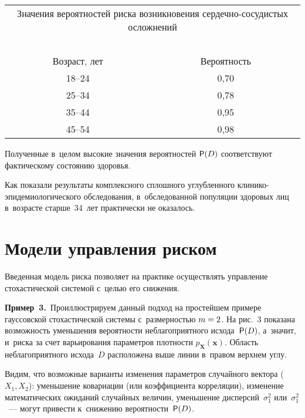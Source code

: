 \begin{multicols}{2}
{\small
  \begin{center}
  \begin{tabular}{|c|c|}
\multicolumn{2}{p{43mm}}{Значения вероятностей риска возникновения 
сер\-деч\-но-со\-су\-ди\-стых ослож\-не\-ний}\\[-6pt]
\multicolumn{2}{c}{\ }\\
\hline
Возраст, лет&Вероятность\\
\hline
18--24&0,70\\
25--34&0,78\\
35--44&0,95\\
45--54&0,98\\
\hline
\end{tabular}
\vspace*{2pt}
\end{center}
}

\columnbreak
  
  
  \noindent
   Полученные в~целом высокие значения 
вероятностей ${\sf P}(D)$ соответствуют фактическому со\-сто\-янию
   здоровья. 
   
   Как 
показали результаты комплексного сплош\-но\-го углуб\-лен\-но\-го  
кли\-ни\-ко-эпи\-де\-мио\-ло\-ги\-че\-ско\-го обследования, в~обследованной 
популяции здоровых лиц в~воз\-рас\-те старше~34~лет практически не оказалось.

 
\section{Модели управления риском}

  Введенная модель риска позволяет на практике осуществлять управ\-ле\-ние 
сто\-ха\-сти\-че\-ской сис\-те\-мой с~целью его снижения.
  
  \bigskip
  
  \noindent
  \textbf{Пример~3.}\ Проиллюстрируем данный подход на прос\-тей\-шем 
примере гауссовской стохастической сис\-те\-мы с~раз\-мер\-ностью $m\hm=2$. На 
рис.~3 показана воз\-мож\-ность уменьшения ве\-ро\-ят\-ности неблагоприятного 
исхода~${\sf P}(D)$, а~значит, и~рис\-ка за счет варьирования па\-ра\-мет\-ров плот\-ности 
$p_{\mathbf{X}}(\mathbf{x})$. Об\-ласть неблагоприятного исхода~$D$ 
рас\-по\-ло\-же\-на выше линии в~правом верх\-нем углу.
  
  Видим, что возможные варианты изменения па\-ра\-мет\-ров случайного вектора 
($X_1, X_2$): уменьшение ковариации (или коэффициента корреляции), 
изменение математических ожиданий случайных величин, уменьшение 
дис\-пер\-сий~$\sigma_1^2$ или~$\sigma_1^2$~--- могут привести к~снижению 
ве\-ро\-ят\-ности~${\sf P}(D)$.
  


\end{multicols}
